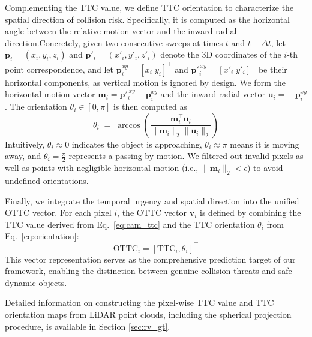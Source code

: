 \documentclass[journal]{IEEEtran}
\begin{document}
Complementing the TTC value, we define TTC orientation to characterize the spatial direction of collision risk. Specifically, it is computed as the horizontal angle between the relative motion vector and the inward radial direction.Concretely, given two consecutive sweeps at times \(t\) and \(t{+}\Delta t\), let \(\mathbf{p}_i=(x_i,y_i,z_i)\) and \(\mathbf{p}'_i=(x'_i,y'_i,z'_i)\) denote the 3D coordinates of the \(i\)-th point correspondence, and let \(\mathbf{p}^{xy}_i=[x_i\;y_i]^\top\) and \(\mathbf{p}'^{\,xy}_i=[x'_i\;y'_i]^\top\) be their horizontal components, as vertical motion is ignored by design. We form the horizontal motion vector \(\mathbf{m}_i=\mathbf{p}'^{\,xy}_i-\mathbf{p}^{xy}_i\) and the inward radial vector \(\mathbf{u}_i=-\,\mathbf{p}^{xy}_i\). The orientation \(\theta_i\in[0,\pi]\) is then computed as
\begin{equation}
\label{eq:orientation}
    \theta_i \;=\; \arccos(\frac{\mathbf{m}_i^\top \mathbf{u}_i}{\lVert\mathbf{m}_i\rVert_2 \lVert\mathbf{u}_i\rVert_2})
\end{equation}
Intuitively, \(\theta_i\approx 0\) indicates the object is approaching, \(\theta_i\approx \pi\) means it is moving away, and \(\theta_i=\tfrac{\pi}{2}\) represents a passing-by motion. We filtered out invalid pixels as well as points with negligible horizontal motion (i.e., \(\lVert\mathbf{m}_i\rVert_2 < \epsilon\)) to avoid undefined orientations.

Finally, we integrate the temporal urgency and spatial direction into the unified OTTC vector. For each pixel \(i\), the OTTC vector \(\mathbf{v}_{i}\) is defined by combining the TTC value derived from Eq.~\ref{eq:cam_ttc} and the TTC orientation \(\theta_i\) from Eq.~\ref{eq:orientation}:
\begin{equation}
\label{eq:ottc_vector}
\mathrm{OTTC}_i = [\mathrm{TTC}_i, \theta_i]^\top
\end{equation}
This vector representation serves as the comprehensive prediction target of our framework, enabling the distinction between genuine collision threats and safe dynamic objects. 

Detailed information on constructing the pixel-wise TTC value and TTC orientation maps from LiDAR point clouds, including the spherical projection procedure, is available in Section \ref{sec:rv_gt}.
\end{document}
